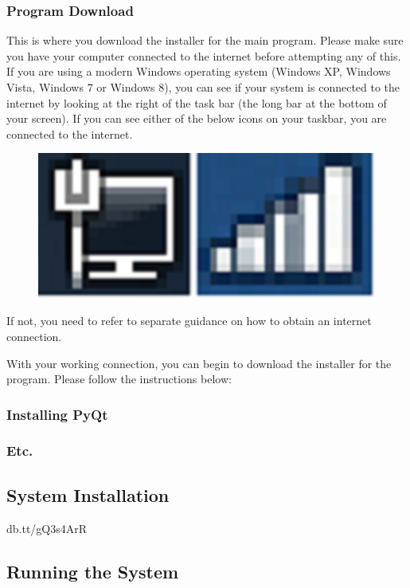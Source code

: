 
\subsubsection{Program Download}
This is where you download the installer for the main program. Please make sure you have your computer connected to the internet before attempting any of this. If you are using a modern Windows operating system (Windows XP, Windows Vista, Windows 7 or Windows 8), you can see if your system is connected to the internet by looking at the right of the task bar (the long bar at the bottom of your screen). If you can see either of the below icons on your taskbar, you are connected to the internet.

\begin{figure}[H]
    \includegraphics[width=\textwidth]{./Manual/Images/Connection.png}
\end{figure}
 If not, you need to refer to separate guidance on how to obtain an internet connection.

With your working connection, you can begin to download the installer for the program. Please follow the instructions below:

\subsubsection{Installing PyQt}

\subsubsection{Etc.}

\subsection{System Installation}
db.tt/gQ3s4ArR
\subsection{Running the System}

